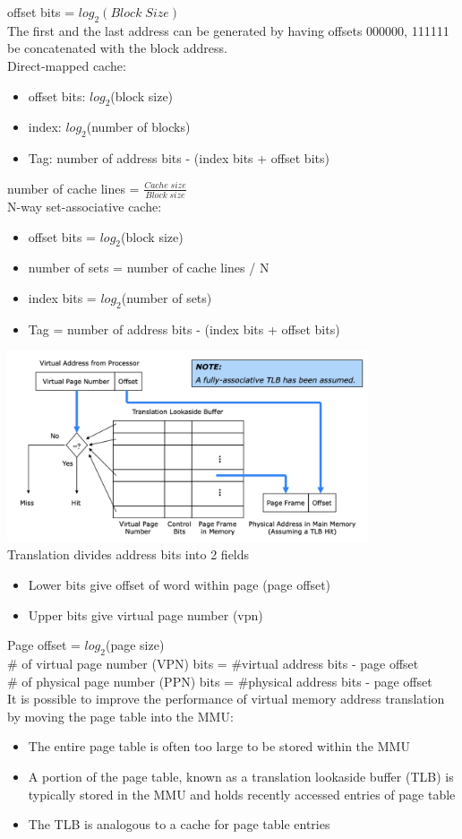 \documentclass[10pt]{article}
\begin{document}
offset bits = $log_2(Block\; Size)$\\
The first and the last address can be generated by having offsets 000000, 111111 be concatenated with the block address.\\
Direct-mapped cache:
\begin{itemize}
    \item offset bits: $log_2$(block size)
    \item index: $log_2$(number of blocks)
    \item Tag: number of address bits - (index bits + offset bits)
\end{itemize}
number of cache lines = $\frac{Cache\;size}{Block\;size}$\\
N-way set-associative cache:
\begin{itemize}
    \item offset bits = $log_2$(block size)
    \item number of sets = number of cache lines / N
    \item index bits = $log_2$(number of sets)
    \item Tag = number of address bits - (index bits + offset bits)
\end{itemize}
\newpage
\includegraphics[width=0.8\textwidth]{memory/tlb.png}\\
Translation divides address bits into 2 fields
\begin{itemize}
    \item Lower bits give offset of word within page (page offset)
    \item Upper bits give virtual page number (vpn)
\end{itemize}
Page offset = $log_2$(page size)\\
\# of virtual page number (VPN) bits = \#virtual address bits - page offset\\
\# of physical page number (PPN) bits = \#physical address bits - page offset\\
It is possible to improve the performance of virtual memory
address translation by moving the page table into the MMU:
\begin{itemize}
    \item The entire page table is often too large to be stored within the MMU
    \item A portion of the page table, known as a translation lookaside buffer (TLB) is typically stored in the MMU and holds recently accessed entries of page table
    \item The TLB is analogous to a cache for page table entries
\end{itemize}
\end{document}
